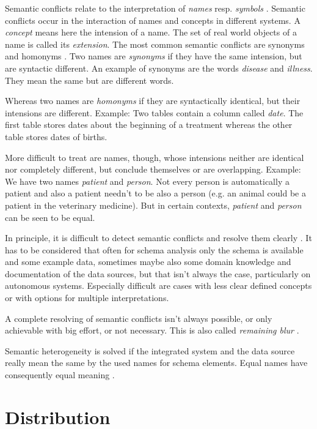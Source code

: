 Semantic conflicts relate to the interpretation of \emph{names} resp. \emph{symbols} \cite[p. 74]{DBLP:books/dp/LeserN2006}. 
Semantic conflicts occur in the interaction of names and concepts in different systems. 
A \textit{concept} means here the intension of a name. The set of real world objects of a name is called its \emph{extension}. 
The most common semantic conflicts are synonyms and homonyms \cite[p. 75]{DBLP:books/dp/LeserN2006}. 
Two names are \textit{synonyms} if they have the same intension, but are syntactic different. An example of synonyms are the words \emph{disease} and \emph{illness}. They mean the same but are different words.

Whereas two names are \textit{homonyms} if they are syntactically identical, but their intensions are different. Example: Two tables contain a column called \emph{date}. The first table stores dates about the beginning of a treatment whereas the other table stores dates of births.

More difficult to treat are names, though, whose intensions neither are identical nor completely different, but conclude themselves or are overlapping.
Example: We have two names \emph{patient} and \emph{person}. Not every person is automatically a patient and also a patient needn't to be also a person (e.g. an animal could be a patient in the veterinary medicine). But in certain contexts, \emph{patient} and \emph{person} can be seen to be equal.

In principle, it is difficult to detect semantic conflicts and resolve them clearly \cite[p. 76]{DBLP:books/dp/LeserN2006}. 
It has to be considered that often for schema analysis  only the schema is available and some example data, sometimes maybe also some domain knowledge and documentation of the data sources, but that isn’t always the case, particularly on autonomous systems. Especially difficult are cases with less clear defined concepts or with options for multiple interpretations.

A complete resolving of semantic conflicts isn't always possible, or only achievable with big effort, or not necessary. This is also called \textit{remaining blur} \cite[p. 76]{DBLP:books/dp/LeserN2006}.

Semantic heterogeneity is solved if the integrated system and the data source really mean the same by the used names for schema elements. Equal names have consequently equal meaning \cite[p. 61]{DBLP:books/dp/LeserN2006}.

\section{Distribution}

